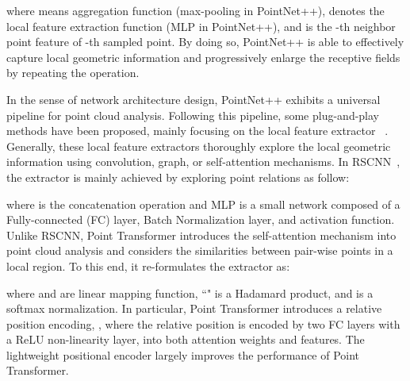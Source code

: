 \documentclass{article} \usepackage{iclr2022_conference,times}
\begin{document}
where  means aggregation function (max-pooling in PointNet++),  denotes the local feature extraction function (MLP in PointNet++), and  is the -th neighbor point feature of -th sampled point. By doing so, PointNet++ is able to effectively capture local geometric information and progressively enlarge the receptive fields by repeating the operation.

In the sense of network architecture design, PointNet++ exhibits a universal pipeline for point cloud analysis. Following this pipeline, some plug-and-play methods have been proposed, mainly focusing on the local feature extractor ~\citep{xu2021paconv,liu2019relation,thomas2019kpconv,zhao2021point}.
Generally, these local feature extractors thoroughly explore the local geometric information using convolution, graph, or self-attention mechanisms. In RSCNN~\citep{liu2019relation}, the extractor is mainly achieved by exploring point relations as follow:

where  is the concatenation operation and MLP is a small network composed of a Fully-connected (FC) layer, Batch Normalization layer, and activation function. Unlike RSCNN, Point Transformer introduces the self-attention mechanism into point cloud analysis and considers the similarities between pair-wise points in a local region. To this end, it re-formulates the extractor as:

where  and  are linear mapping function, ``" is a Hadamard product, and  is a softmax normalization. In particular, Point Transformer introduces a relative position encoding, , where the relative position is encoded by two FC layers with a ReLU non-linearity layer, into both attention weights and features. The lightweight positional encoder largely improves the performance of Point Transformer.
\end{document}
